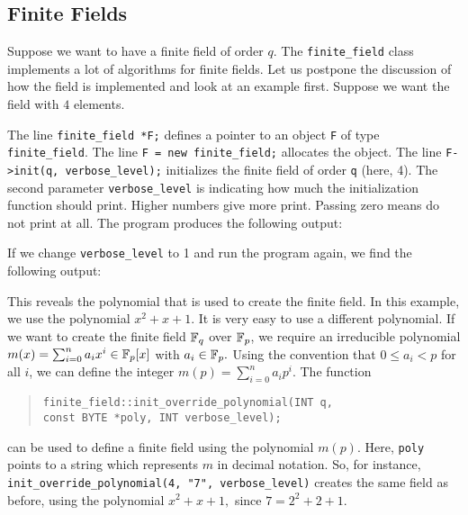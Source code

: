 \subsection{Finite Fields}


Suppose we want to have a finite field of order $q$. The \verb'finite_field' class 
implements a lot of algorithms for finite fields. Let us postpone the discussion of how the field is implemented and look at an example first.
Suppose we want the field with $4$ elements.

{\tt

}

The line \verb'finite_field *F;' defines a pointer to an object \verb'F' 
of type \verb'finite_field'. The line \verb'F = new finite_field;' allocates the object.
The line \verb'F->init(q, verbose_level);' initializes the finite field of order \verb'q' (here, 4).
The second parameter \verb'verbose_level' is indicating how much the initialization function should print. 
Higher numbers give more print. Passing zero means do not print at all.
The program produces the following output:

{\tt

}

If we change \verb'verbose_level' to 1 
and run the program again, we find the following output:

{\tt

}

This reveals the polynomial that is used to create the finite field. 
In this example, we use the polynomial 
$x^2+x+1.$ It is very easy to use a different polynomial. 
If we want to create the finite field 
${\mathbb F}_q$ over ${\mathbb F}_p$, we require an irreducible 
polynomial $m(x) = \sum_{i=0}^{n}a_i x^i \in {\mathbb F}_p[x]$ with $a_i \in {\mathbb F}_p.$
Using the convention that $0 \le a_i < p$ for all $i$, we can define the integer 
$m(p) = \sum_{i=0}^{n}a_i p^i.$ 
The function 
\begin{quote}
\verb'finite_field::init_override_polynomial(INT q,' \\
\quad\verb'const BYTE *poly, INT verbose_level);'
\end{quote}
can be used to define a finite field using the polynomial $m(p).$ 
Here, \verb'poly' points to a string which represents $m$ in decimal notation. 
So, for instance,  \verb'init_override_polynomial(4, "7", verbose_level)' creates the same field as before,  
using the polynomial $x^2+x+1,$ since $7 = 2^2+2+1.$

\smallskip


